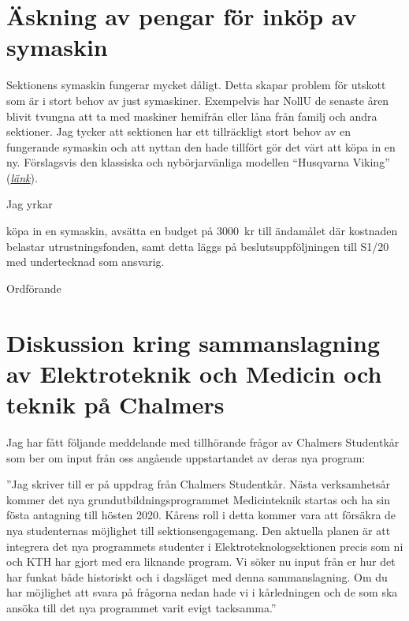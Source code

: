 \documentclass[10pt]{article}
\def\doctype{Handlingar} %
\def\mname{Styrelsemöte} %
\def\mnum{S29/19} %
\begin{document}
    
    \heading{{\doctype} till {\mname} {\mnum}}
    

    \section*{Äskning av pengar för inköp av symaskin}
    
 	Sektionens symaskin fungerar mycket dåligt. Detta skapar problem för utskott som är i stort behov av just symaskiner. Exempelvis har NollU de senaste åren blivit tvungna att ta med maskiner hemifrån eller låna från familj och andra sektioner. Jag tycker att sektionen har ett tillräckligt stort behov av en fungerande symaskin och att nyttan den hade tillfört gör det värt att köpa in en ny. Förslagsvis den klassiska och nybörjarvänliga modellen “Husqvarna Viking” (\href{https://www.symaskinskungen.se/Symaskiner/HUSQVARNA-VIKING-SYMASKINER/Mekaniska-symaskiner/Symaskin-Husqvarna-viking-H-Class-E20.htm?sClickID=GoogleShopping-124&gclid=Cj0KCQjw9fntBRCGARIsAGjFq5EboAI093hS8rlKYf87E6Z-8H_8kmKeCPqz9YrwMDL9QLbpHydsQzcaAvYvEALw_wcB}{\textit{länk}}). 

    Jag yrkar
    \begin{attsatser}
        \att köpa in en symaskin, 
        \att avsätta en budget på \SI{3000}{kr} till ändamålet där kostnaden belastar utrustningsfonden, samt
        \att detta läggs på beslutsuppföljningen till S1/20 med undertecknad som ansvarig. 
    \end{attsatser}

    \begin{signatures}{1}
    \textit{\ist}
    \signature{Edvard Carlsson}{Ordförande}
    \end{signatures}



    \newpage

    \section*{Diskussion kring sammanslagning av Elektroteknik och Medicin och teknik på Chalmers}
    
 	Jag har fått följande meddelande med tillhörande frågor av Chalmers Studentkår som ber om input från oss angående uppstartandet av deras nya program:

    ''Jag skriver till er på uppdrag från Chalmers Studentkår. Nästa verksamhetsår kommer det nya grundutbildningsprogrammet Medicinteknik startas och ha sin fösta antagning till hösten 2020. Kårens roll i detta kommer vara att försäkra de nya studenternas möjlighet till sektionsengagemang. Den aktuella planen är att integrera det nya programmets studenter i Elektroteknologsektionen precis som ni och KTH har gjort med era liknande program. Vi söker nu input från er hur det har funkat både historiskt och i dagsläget med denna sammanslagning. Om du har möjlighet att svara på frågorna nedan hade vi i kårledningen och de som ska ansöka till det nya programmet varit evigt tacksamma.''
\end{document}
